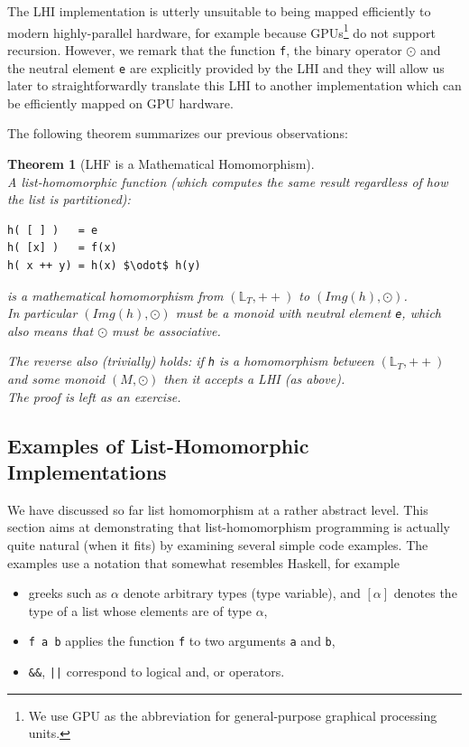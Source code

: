 \documentclass[acmsmall,review]{acmart}\settopmatter{printfolios=true,printccs=false,printacmref=false}
\newtheorem{mytheo}{Theorem}
\begin{document}
The LHI implementation is utterly unsuitable to being mapped efficiently
to modern highly-parallel hardware, for example because GPUs\footnote{
We use GPU as the abbreviation for general-purpose graphical processing
units.} do not support recursion. However, we remark that the function 
{\tt f}, the binary operator $\odot$ and the neutral element {\tt e} 
are explicitly provided by the LHI and they will allow us later to 
straightforwardly translate this LHI to another implementation which 
can be efficiently mapped on GPU hardware.

The following theorem summarizes our previous observations:
\begin{mytheo}[LHF is a Mathematical Homomorphism]\label{LHF-as-Hom}
$\mbox{ }$\\
A list-homomorphic function (which computes the same result
regardless of how the list is partitioned):
\begin{lstlisting}[mathescape=true]
h( [ ] )   = e
h( [x] )   = f(x)
h( x ++ y) = h(x) $\odot$ h(y)
\end{lstlisting}\vspace{-2ex}
is a mathematical homomorphism from $(\mathbb{L}_T,++)$ to $(Img(h),\odot)$.\\
In particular $(Img(h),\odot)$ must be a monoid with neutral element {\tt e},
which also means that $\odot$ must be associative.\smallskip

The reverse also (trivially) holds: if {\tt h} is a homomorphism between
$(\mathbb{L}_T,++)$ and some monoid $(M,\odot)$ then it accepts a LHI
(as above).\\
\emph{The proof} is left as an exercise. 
\end{mytheo}

\subsection{Examples of List-Homomorphic Implementations}
\label{subsec:LH-egs}

We have discussed so far list homomorphism at a rather abstract
level. This section aims at demonstrating that list-homomorphism
programming is actually quite natural (when it fits) by examining 
several simple code examples. The examples use a notation that 
somewhat resembles Haskell, for example
\begin{itemize}
    \item  greeks such as $\alpha$ denote arbitrary types (type variable),
      and $[\alpha]$ denotes the type of a list whose elements are
      of type $\alpha$,
       
    \item \lstinline{f a b} applies the function \lstinline{f} to two arguments 
      \lstinline{a} and \lstinline{b}, 

    \item \lstinline{&&}, \lstinline{||} correspond to logical and, or operators. 
\end{itemize}
\end{document}
